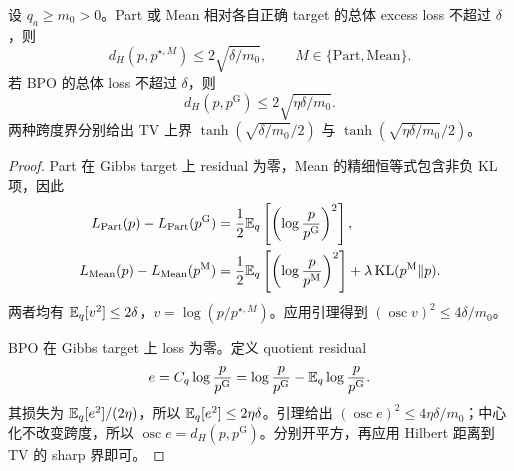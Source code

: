 \begin{proposition}
\label{dyn:regression-gap}
设 $q_a\ge m_0>0$。Part 或 Mean 相对各自正确 target 的总体 excess loss 不超过 $\delta$，则
\begin{equation}
d_H(p,p^{\star,M})\le2\sqrt{\delta/m_0},
\qquad M\in\{\mathrm{Part},\mathrm{Mean}\}.
\end{equation}
若 BPO 的总体 loss 不超过 $\delta$，则
\begin{equation}
d_H(p,p^{\mathrm G})\le2\sqrt{\eta\delta/m_0}.
\end{equation}
两种跨度界分别给出 TV 上界 $\tanh(\sqrt{\delta/m_0}/2)$ 与 $\tanh(\sqrt{\eta\delta/m_0}/2)$。
\end{proposition}
\begin{proof}
Part 在 Gibbs target 上 residual 为零，Mean 的精细恒等式包含非负 KL 项，因此
\begin{align*}
L_{\mathrm{Part}}(p)-L_{\mathrm{Part}}(p^{\mathrm G})
&=\frac12\mathbb E_q\left[\left(\log\frac p{p^{\mathrm G}}\right)^2\right],\\
L_{\mathrm{Mean}}(p)-L_{\mathrm{Mean}}(p^{\mathrm M})
&=\frac12\mathbb E_q\left[\left(\log\frac p{p^{\mathrm M}}\right)^2\right]
+\lambda\operatorname{KL}(p^{\mathrm M}\Vert p).
\end{align*}
两者均有 $\mathbb E_q[v^2]\le2\delta$，$v=\log(p/p^{\star,M})$。应用引理得到 $(\operatorname{osc}v)^2\le4\delta/m_0$。

BPO 在 Gibbs target 上 loss 为零。定义 quotient residual
\begin{equation*}
e=C_q\log\frac p{p^{\mathrm G}}
=\log\frac p{p^{\mathrm G}}-\mathbb E_q\log\frac p{p^{\mathrm G}}.
\end{equation*}
其损失为 $\mathbb E_q[e^2]/(2\eta)$，所以 $\mathbb E_q[e^2]\le2\eta\delta$。引理给出 $(\operatorname{osc}e)^2\le4\eta\delta/m_0$；中心化不改变跨度，所以 $\operatorname{osc}e=d_H(p,p^{\mathrm G})$。分别开平方，再应用 Hilbert 距离到 TV 的 sharp 界即可。
\end{proof}

